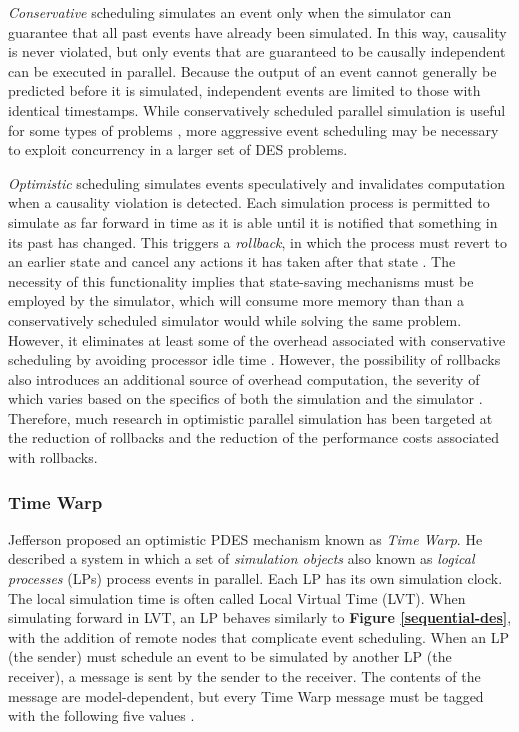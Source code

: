\documentclass[11pt]{book}
\begin{document}
\textit{Conservative} scheduling simulates an event only when the simulator can
guarantee that all past events have already been simulated. In this way,
causality is never violated, but only events that are guaranteed to be causally
independent can be executed in parallel. Because the output of an event cannot
generally be predicted before it is simulated, independent events are limited to
those with identical timestamps. While conservatively scheduled parallel
simulation is useful for some types of problems \cite{nicol-93b}, more
aggressive event scheduling may be necessary to exploit concurrency in a larger
set of DES problems.

\textit{Optimistic} scheduling simulates events speculatively and invalidates
computation when a causality violation is detected. Each simulation process is
permitted to simulate as far forward in time as it is able until it is notified
that something in its past has changed. This triggers a \textit{rollback}, in
which the process must revert to an earlier state and cancel any actions it has
taken after that state \cite{nicol-93b}. The necessity of this functionality
implies that state-saving mechanisms must be employed by the simulator, which
will consume more memory than than a conservatively scheduled simulator would
while solving the same problem. However, it eliminates at least some of the
overhead associated with conservative scheduling by avoiding processor idle time
\cite{nicol-93b}. However, the possibility of rollbacks also introduces an
additional source of overhead computation, the severity of which varies based on
the specifics of both the simulation and the simulator
\cite{fujimoto-pdes}. Therefore, much research in optimistic parallel simulation
has been targeted at the reduction of rollbacks and the reduction of the
performance costs associated with rollbacks.

\subsubsection{\textbf{Time Warp}}
\label{time-warp}

Jefferson \cite{jefferson-85} proposed an optimistic PDES mechanism known as
\textit{Time Warp}. He described a system in which a set of \textit{simulation
  objects} also known as \textit{logical processes} (LPs) process events in
parallel. Each LP has its own simulation clock. The local simulation time is
often called Local Virtual Time (LVT). When simulating forward in LVT, an LP
behaves similarly to \textbf{Figure \ref{sequential-des}}, with the addition of
remote nodes that complicate event scheduling. When an LP (the sender) must schedule an event
to be simulated by another LP (the receiver), a message is sent by the sender to
the receiver. The contents of the message are model-dependent, but every Time
Warp message must be tagged with the following five values \cite{jefferson-85}.
\end{document}

